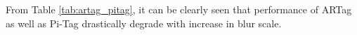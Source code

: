 \documentclass[runningheads]{llncs}
\begin{document}
From Table \ref{tab:artag_pitag}, it can be clearly seen that performance of
ARTag as well as Pi-Tag drastically degrade with increase in blur scale.

\end{document}
